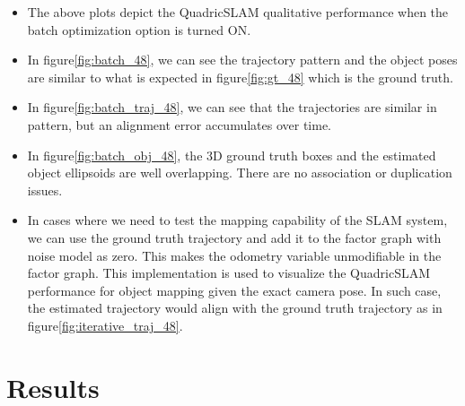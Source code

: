 \documentclass[report.tex]{subfiles}
\begin{document}
\begin{itemize}
    \item The above plots depict the QuadricSLAM qualitative performance when the batch optimization option is turned ON.
    \item In figure\ref{fig:batch_48}, we can see the trajectory pattern and the object poses are similar to what is expected in figure\ref{fig:gt_48} which is the ground truth.
    \item In figure\ref{fig:batch_traj_48}, we can see that the trajectories are similar in pattern, but an alignment error accumulates over time.
    \item In figure\ref{fig:batch_obj_48}, the 3D ground truth boxes and the estimated object ellipsoids are well overlapping. There are no association or duplication issues.
    
    \item In cases where we need to test the mapping capability of the SLAM system, we can use the ground truth trajectory and add it to the factor graph with noise model as zero. This makes the odometry variable unmodifiable in the factor graph. This implementation is used to visualize the QuadricSLAM performance for object mapping given the exact camera pose. In such case, the estimated trajectory would align with the ground truth trajectory as in figure\ref{fig:iterative_traj_48}.
    \end{itemize}



    \section{Results}
\end{document}
